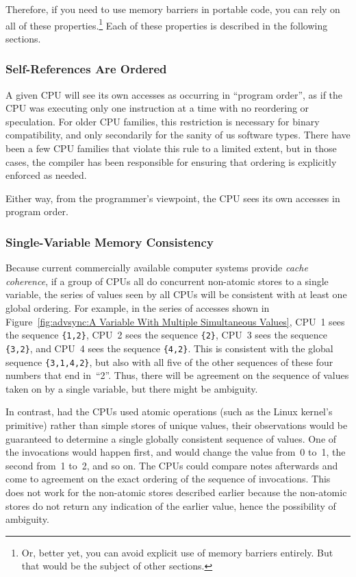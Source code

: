 Therefore, if you need to use memory barriers in portable code,
you can rely on all of these properties.\footnote{
	Or, better yet, you can avoid explicit use of memory barriers
	entirely.
	But that would be the subject of other sections.}
Each of these properties is described in the following sections.

\subsubsection{Self-References Are Ordered}

A given CPU will see its own accesses as occurring in ``program order'',
as if the CPU was executing only one instruction at a time with no
reordering or speculation.
For older CPU families, this restriction is necessary for binary compatibility,
and only secondarily for the sanity of us software types.
There have been a few CPU families that violate this rule to a limited extent,
but in those cases, the compiler has been responsible
for ensuring that ordering is explicitly enforced as needed.

Either way, from the programmer's viewpoint, the CPU sees its own accesses
in program order.

\subsubsection{Single-Variable Memory Consistency}
\label{sec:advsync:Single-Variable Memory Consistency}

Because current commercially available computer systems provide
\emph{cache coherence},
if a group of CPUs all do concurrent non-atomic stores to a single variable,
the series of values seen by all CPUs will be consistent with at
least one global ordering.
For example, in the series of accesses shown in
Figure~\ref{fig:advsync:A Variable With Multiple Simultaneous Values},
CPU~1 sees the sequence {\tt \{1,2\}},
CPU~2 sees the sequence {\tt \{2\}},
CPU~3 sees the sequence {\tt \{3,2\}},
and
CPU~4 sees the sequence {\tt \{4,2\}}.
This is consistent with the global sequence {\tt \{3,1,4,2\}},
but also with all five of the other sequences of these four numbers that end
in~``2''.
Thus, there will be agreement on the sequence of values taken on
by a single variable, but there might be ambiguity.

In contrast, had the CPUs used atomic operations (such as the Linux kernel's
 primitive) rather than simple stores of
unique values, their observations would
be guaranteed to determine a single globally consistent sequence of values.
One of the  invocations would happen first,
and would change the value from~0 to~1, the second from~1 to~2, and
so on.
The CPUs could compare notes afterwards and come to agreement on the
exact ordering of the sequence of  invocations.
This does not work for the non-atomic stores described earlier because
the non-atomic stores do not return any indication of the earlier value,
hence the possibility of ambiguity.

